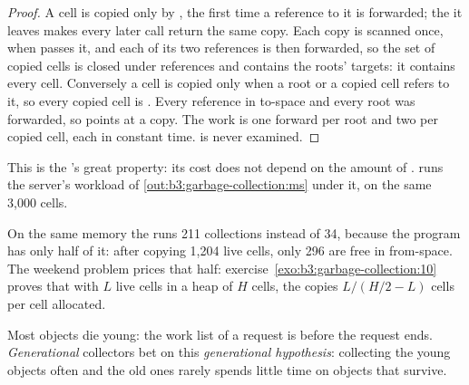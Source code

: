 \begin{proof}
A cell is copied only by , the first time a reference to it is forwarded; the  it leaves makes every later call return the same copy. Each copy is scanned once, when  passes it, and each of its two references is then forwarded, so the set of copied cells is closed under references and contains the roots' targets: it contains every  cell. Conversely a cell is copied only when a root or a copied cell refers to it, so every copied cell is . Every reference in to-space and every root was forwarded, so points at a copy. The work is one forward per root and two per copied cell, each in constant time.  is never examined.
\end{proof}

This is the 's great property: its cost does not depend on the amount of .  runs the server's workload of \cref{out:b3:garbage-collection:ms} under it, on the same 3,000 cells.

\label{out:b3:garbage-collection:cheney}

On the same memory the  runs 211 collections instead of 34, because the program has only half of it: after copying 1,204 live cells, only 296 are free in from-space. The weekend problem prices that half: exercise~\ref{exo:b3:garbage-collection:10} proves that with $L$ live cells in a heap of $H$ cells, the  copies $L/(H/2 - L)$ cells per cell allocated.

Most objects die young: the work list of a request is  before the request ends. \emph{Generational} collectors bet on this \emph{generational hypothesis}: collecting the young objects often and the old ones rarely spends little time on objects that survive.

